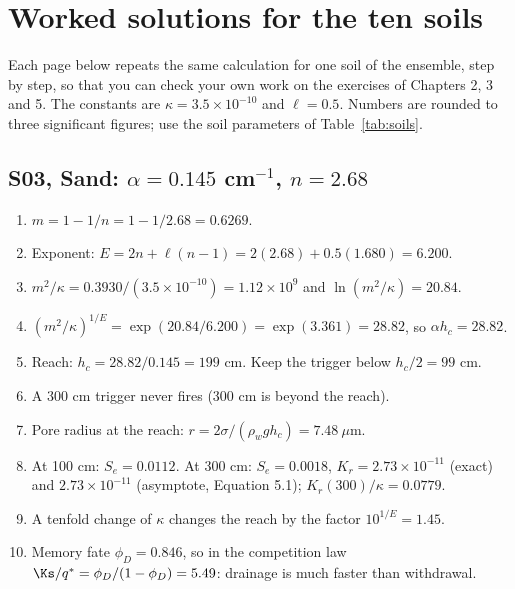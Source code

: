\chapter{Worked solutions for the ten soils}
Each page below repeats the same calculation for one soil of the ensemble, step by step, so that you can check your own work on the exercises of Chapters 2, 3 and 5. The constants are $\kappa=3.5\times10^{-10}$ and $\ell=0.5$. Numbers are rounded to three significant figures; use the soil parameters of Table~\ref{tab:soils}.
\section{S03, Sand: $\alpha=0.145$ cm$^{-1}$, $n=2.68$}
\begin{enumerate}[leftmargin=*,itemsep=1pt]
\item $m=1-1/n=1-1/2.68=0.6269$.
\item Exponent: $E=2n+\ell(n-1)=2(2.68)+0.5(1.680)=6.200$.
\item $m^2/\kappa=0.3930/(3.5\times10^{-10})=1.12\times10^{9}$ and $\ln(m^2/\kappa)=20.84$.
\item $(m^2/\kappa)^{1/E}=\exp(20.84/6.200)=\exp(3.361)=28.82$, so $\alpha h_c=28.82$.
\item Reach: $h_c=28.82/0.145=199$ cm. Keep the trigger below $h_c/2=99$ cm.
\item A 300 cm trigger never fires (300 cm is beyond the reach).
\item Pore radius at the reach: $r=2\sigma/(\rho_wgh_c)=7.48\ \mu$m.
\item At 100 cm: $S_e=0.0112$. At 300 cm: $S_e=0.0018$, $K_r=2.73\times10^{-11}$ (exact) and $2.73\times10^{-11}$ (asymptote, Equation 5.1); $K_r(300)/\kappa=0.0779$.
\item A tenfold change of $\kappa$ changes the reach by the factor $10^{1/E}=1.45$.
\item Memory fate $\phi_D=0.846$, so in the competition law $\Ks/q^*=\phi_D/(1-\phi_D)=5.49$: drainage is much faster than withdrawal.
\end{enumerate}
